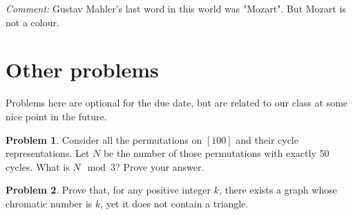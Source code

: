 \documentclass[12pt]{article}
\theoremstyle{definition}
\newtheorem{hw}{Problem}
\begin{document}
{\em Comment:} Gustav Mahler's last word in this world was "Mozart". But Mozart is not a colour.

\section{Other problems}

Problems here are optional for the due date, but are related to our class at some nice point in the future.

\begin{hw}
Consider all the permutations on $[100]$ and their cycle
representations.
Let $N$ be the number of those permutations with
exactly 50 cycles. What is $N \mod 3$? Prove your answer.
\end{hw}

\begin{hw}
Prove that, for any positive integer $k$, there exists
a graph whose chromatic number is $k$, yet it does not
contain a triangle.
\end{hw}
\end{document}
